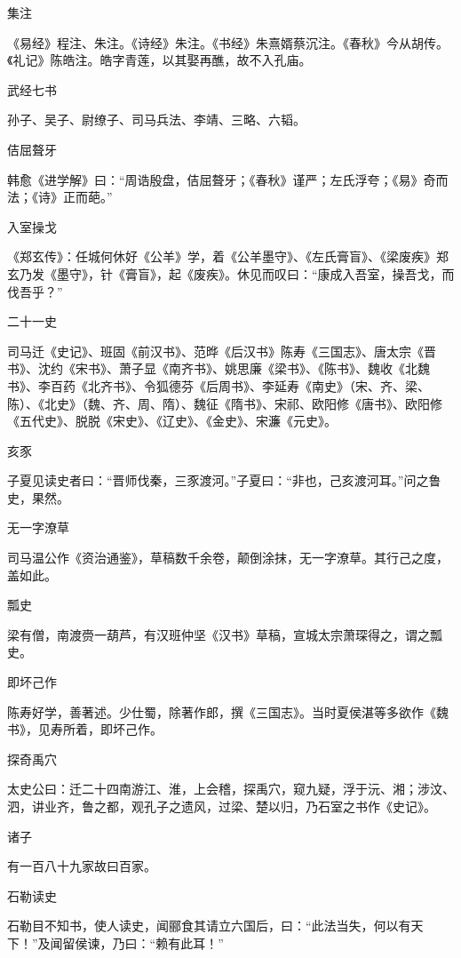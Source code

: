 \documentclass[a4paper,12pt,UTF8,twoside]{ctexbook}
\begin{document}
    集注
    
    《易经》程注、朱注。《诗经》朱注。《书经》朱熹婿蔡沉注。《春秋》今从胡传。《礼记》陈皓注。皓字青莲，以其娶再醮，故不入孔庙。
    
    武经七书
    
    孙子、吴子、尉缭子、司马兵法、李靖、三略、六韬。
    
    佶屈聱牙
    
    韩愈《进学解》曰：“周诰殷盘，佶屈聱牙；《春秋》谨严；左氏浮夸；《易》奇而法；《诗》正而葩。”
    
    入室操戈
    
    《郑玄传》：任城何休好《公羊》学，着《公羊墨守》、《左氏膏盲》、《梁废疾》郑玄乃发《墨守》，针《膏盲》，起《废疾》。休见而叹曰：“康成入吾室，操吾戈，而伐吾乎？”
    
    二十一史
    
    司马迁《史记》、班固《前汉书》、范晔《后汉书》陈寿《三国志》、唐太宗《晋书》、沈约《宋书》、萧子显《南齐书》、姚思廉《梁书》、《陈书》、魏收《北魏书》、李百药《北齐书》、令狐德芬《后周书》、李延寿《南史》（宋、齐、梁、陈）、《北史》（魏、齐、周、隋）、魏征《隋书》、宋祁、欧阳修《唐书》、欧阳修《五代史》、脱脱《宋史》、《辽史》、《金史》、宋濂《元史》。
    
    亥豕
    
    子夏见读史者曰：“晋师伐秦，三豕渡河。”子夏曰：“非也，己亥渡河耳。”问之鲁史，果然。
    
    无一字潦草
    
    司马温公作《资治通鉴》，草稿数千余卷，颠倒涂抹，无一字潦草。其行己之度，盖如此。
    
    瓢史
    
    梁有僧，南渡赍一葫芦，有汉班仲坚《汉书》草稿，宣城太宗萧琛得之，谓之瓢史。
    
    即坏己作
    
    陈寿好学，善著述。少仕蜀，除著作郎，撰《三国志》。当时夏侯湛等多欲作《魏书》，见寿所着，即坏己作。
    
    探奇禹穴
    
    太史公曰：迁二十四南游江、淮，上会稽，探禹穴，窥九疑，浮于沅、湘；涉汶、泗，讲业齐，鲁之都，观孔子之遗风，过梁、楚以归，乃石室之书作《史记》。
    
    诸子
    
    有一百八十九家故曰百家。
    
    石勒读史
    
    石勒目不知书，使人读史，闻郦食其请立六国后，曰：“此法当失，何以有天下！”及闻留侯谏，乃曰：“赖有此耳！”
    
\end{document}
